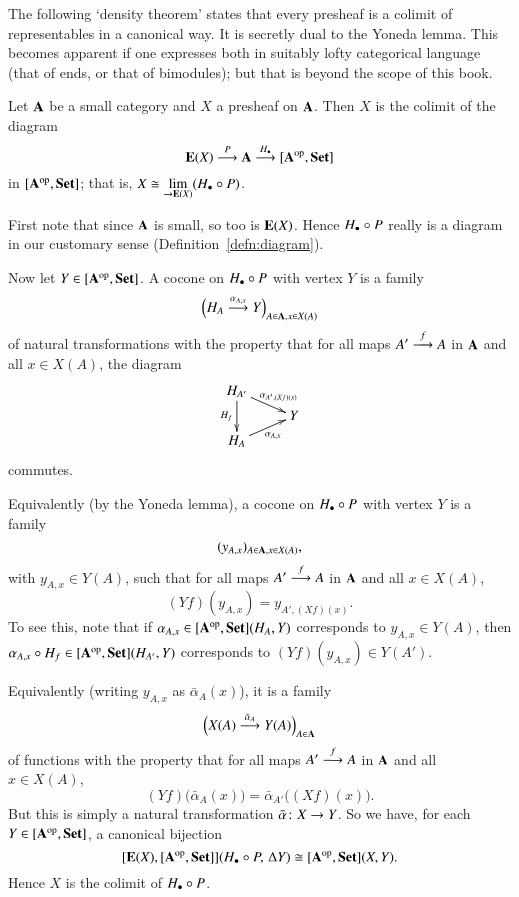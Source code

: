 The following `density theorem' states that every presheaf is a colimit of
representables in a canonical way.  It is secretly dual to the Yoneda
lemma.  This becomes apparent if one expresses both in suitably lofty
categorical language (that of ends, or that of bimodules); but that is
beyond the scope of this book.

\begin{thm}[Density]
\label{thm:density}
%
% 
Let $\mathbf{A}$ be a small category and $X$ a presheaf on $\mathbf{A}$.  Then $X$
is the colimit of the diagram
\[
\mathbf{E}(X) \stackrel{P}{\longrightarrow} \mathbf{A} \stackrel{H_\bullet}{\longrightarrow} [\mathbf{A}^{\mathrm{op}},\mathbf{Set}]
\] 
in $[\mathbf{A}^{\mathrm{op}},\mathbf{Set}]$; that is, $X \cong \lim\limits_{\rightarrow \mathbf{E}(X)} (H_\bullet \mathbin{\circ} P)$.
\end{thm}

\begin{pf}
First note that since $\mathbf{A}$ is small, so too is $\mathbf{E}(X)$.  Hence $H_\bullet
\mathbin{\circ} P$ really is a diagram in our customary sense
(Definition~\ref{defn:diagram}). 

Now let $Y \in [\mathbf{A}^{\mathrm{op}},\mathbf{Set}]$.  A cocone on $H_\bullet \mathbin{\circ} P$ with vertex $Y$ is
a family
\[
\Bigl(H_A \stackrel{\alpha_{A, x}}{\longrightarrow} Y\Bigr)_{A \in \mathbf{A}, x \in X(A)}
\]
of natural transformations with the property that for all maps $A'
\stackrel{f}{\longrightarrow} A$ in $\mathbf{A}$ and all $x \in X(A)$, the diagram
\[
\xymatrix@R=1ex{
\h_{A'} \ar[rd]^-{\alpha_{A', (Xf)(x)}} \ar[dd]_{\h_f}   &       \\
                                                        &Y      \\
\h_A \ar[ru]_-{\alpha_{A, x}}
}
\]
commutes.  

Equivalently (by the Yoneda lemma), a cocone on $H_\bullet \mathbin{\circ} P$ with vertex $Y$
is a family 
\[
(y_{A, x})_{A \in \mathbf{A}, x \in X(A)},
\]
with $y_{A, x} \in Y(A)$, such that for all maps $A' \stackrel{f}{\longrightarrow} A$ in
$\mathbf{A}$ and all $x \in X(A)$,
\[
(Yf)(y_{A, x}) = y_{A', (Xf)(x)}.
\]
To see this, note that if $\alpha_{A, x} \in [\mathbf{A}^{\mathrm{op}},\mathbf{Set}](H_A, Y)$
corresponds to $y_{A, x} \in Y(A)$, then $\alpha_{A, x} \mathbin{\circ} H_f \in
[\mathbf{A}^{\mathrm{op}},\mathbf{Set}](H_{A'}, Y)$ corresponds to $(Yf)(y_{A, x}) \in Y(A')$.

Equivalently (writing $y_{A, x}$ as $\bar{\alpha}_A(x)$), it is a family
\[
\Bigl(X(A) \stackrel{\bar{\alpha}_A}{\longrightarrow} Y(A)\Bigr)_{A \in \mathbf{A}}
\] 
of functions with the property that for all maps $A' \stackrel{f}{\longrightarrow} A$
in $\mathbf{A}$ and all $x \in X(A)$,
\[
(Yf)\bigl(\bar{\alpha}_A(x)\bigr) 
=
\bar{\alpha}_{A'}\bigl((Xf)(x)\bigr).
\]
But this is simply a natural transformation $\bar{\alpha}\from X \to Y$.
So we have, for each $Y \in [\mathbf{A}^{\mathrm{op}},\mathbf{Set}]$, a canonical bijection
\[
[\mathbf{E}(X),[\mathbf{A}^{\mathrm{op}},\mathbf{Set}]] (H_\bullet \mathbin{\circ} P, \, \Delta Y)
\cong 
[\mathbf{A}^{\mathrm{op}},\mathbf{Set}] (X, Y).
\]
Hence $X$ is the colimit of $H_\bullet \mathbin{\circ} P$.
\end{pf}

